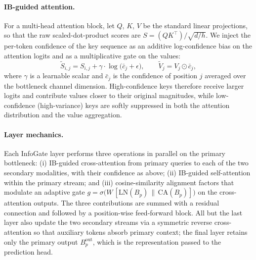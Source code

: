 \documentclass[11pt]{article}
\begin{document}
\paragraph{IB-guided attention.}
For a multi-head attention block, let $Q$, $K$, $V$ be the standard linear
projections, so that the raw scaled-dot-product scores are
$S = (Q K^{\top})/\sqrt{d/h}$. We inject the per-token confidence of the key
sequence as an additive log-confidence bias on the attention logits and as a
multiplicative gate on the values:
\begin{equation}
  \tilde{S}_{i,j}
    = S_{i,j} + \gamma \cdot \log\!\bigl(\bar{c}_j + \epsilon\bigr),
  \qquad
  \tilde{V}_j = V_j \odot \bar{c}_j,
\end{equation}
where $\gamma$ is a learnable scalar and $\bar{c}_j$ is the confidence of
position $j$ averaged over the bottleneck channel dimension.
High-confidence keys therefore receive larger logits and contribute values
closer to their original magnitudes, while low-confidence (high-variance)
keys are softly suppressed in both the attention distribution and the value
aggregation.

\paragraph{Layer mechanics.}
Each InfoGate layer performs three operations in parallel on the primary
bottleneck: (i) IB-guided cross-attention from primary queries to each of the
two secondary modalities, with their confidence as above; (ii) IB-guided
self-attention within the primary stream; and (iii) cosine-similarity
alignment factors that modulate an adaptive gate
$g = \sigma\bigl(W\,[\mathrm{LN}(B_p)\,\|\,\mathrm{CA}(B_p)]\bigr)$ on the
cross-attention outputs. The three contributions are summed with a residual
connection and followed by a position-wise feed-forward block. All but the
last layer also update the two secondary streams via a symmetric reverse
cross-attention so that auxiliary tokens absorb primary context; the final
layer retains only the primary output $B_p^{\mathrm{out}}$, which is the
representation passed to the prediction head.
\end{document}
